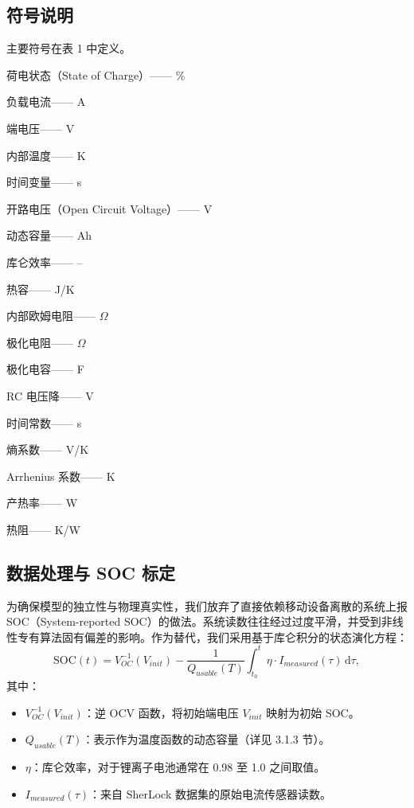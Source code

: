 \documentclass[11pt,a4paper]{ctexart}
\begin{document}
\subsection{符号说明}

主要符号在表 1 中定义。

\begin{description}[leftmargin=3.2em,style=nextline,itemsep=0.1em]
\item[$\mathrm{SOC}$] 荷电状态（State of Charge）—— \%
\item[$I(t)$] 负载电流—— A
\item[$V_O$] 端电压—— V
\item[$T$] 内部温度—— K
\item[$t$] 时间变量—— s
\item[$V_{OC}$] 开路电压（Open Circuit Voltage）—— V
\item[$Q(T)$] 动态容量—— Ah
\item[$\eta$] 库仑效率—— --
\item[$C_{th}$] 热容—— J/K
\item[$R_0$] 内部欧姆电阻—— $\Omega$
\item[$R_{1,2}$] 极化电阻—— $\Omega$
\item[$C_{1,2}$] 极化电容—— F
\item[$V_{1,2}$] RC 电压降—— V
\item[$\tau_{1,2}$] 时间常数—— s
\item[$\lambda_T$] 熵系数—— V/K
\item[$\beta$] Arrhenius 系数—— K
\item[$P_{heat}$] 产热率—— W
\item[$R_{th}$] 热阻—— K/W
\end{description}

\subsection{数据处理与 SOC 标定}

为确保模型的独立性与物理真实性，我们放弃了直接依赖移动设备离散的系统上报 SOC（System-reported SOC）的做法。系统读数往往经过过度平滑，并受到非线性专有算法固有偏差的影响。作为替代，我们采用基于库仑积分的状态演化方程：
\begin{equation}
\mathrm{SOC}(t) = V_{OC}^{-1}(V_{init}) - \frac{1}{Q_{usable}(T)}\int_{t_0}^{t}\eta\cdot I_{measured}(\tau)\,\mathrm{d}\tau,
\end{equation}
其中：

\begin{itemize}[leftmargin=1.6em,itemsep=0.2em]
\item $V_{OC}^{-1}(V_{init})$：逆 OCV 函数，将初始端电压 $V_{init}$ 映射为初始 SOC。
\item $Q_{usable}(T)$：表示作为温度函数的动态容量（详见 3.1.3 节）。
\item $\eta$：库仑效率，对于锂离子电池通常在 0.98 至 1.0 之间取值。
\item $I_{measured}(\tau)$：来自 SherLock 数据集的原始电流传感器读数。
\end{itemize}
\end{document}
